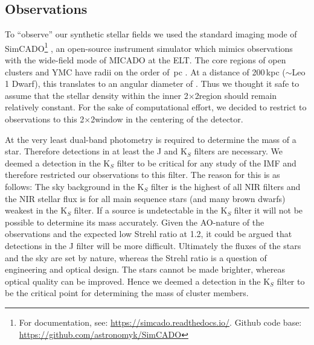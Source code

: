 
\subsection{Observations}
\label{sec:telescope}

To ``observe'' our synthetic stellar fields we used the standard imaging mode of SimCADO\footnote{For documentation, see: \url{https://simcado.readthedocs.io/}. Github code base: \url{https://github.com/astronomyk/SimCADO}} \citep{leschinski2016}, an open-source instrument simulator which mimics observations with the wide-field mode of MICADO at the ELT. 
The core regions of open clusters and YMC have radii on the order of \,pc \citep{portegies2010}. 
At a distance of 200\,kpc ($\sim$Leo 1 Dwarf), this translates to an angular diameter of \arcsec. Thus we thought it safe to assume that the stellar density within the inner 2\arcsec$\times$2\arcsec region should remain relatively constant.
For the sake of computational effort, we decided to restrict to observations to this 2\arcsec$\times$2\arcsec window in the centering of the detector.

At the very least dual-band photometry is required to determine the mass of a star. Therefore detections in at least the J and K$_S$ filters are necessary. 
We deemed a detection in the K$_S$ filter to be critical for any study of the IMF and therefore restricted our observations to this filter. 
The reason for this is as follows: The sky background in the K$_S$ filter is the highest of all NIR filters and the NIR stellar flux is for all main sequence stars (and many brown dwarfs) weakest in the K$_S$ filter. 
If a source is undetectable in the K$_S$ filter it will not be possible to determine its mass accurately. Given the AO-nature of the observations and the expected low Strehl ratio at 1.2\um \citep{clenet2016}, it could be argued that detections in the J filter will be more difficult. 
Ultimately the fluxes of the stars and the sky are set by nature, whereas the Strehl ratio is a question of engineering and optical design. 
The stars cannot be made brighter, whereas optical quality can be improved. 
Hence we deemed a detection in the K$_S$ filter to be the critical point for determining the mass of cluster members.

